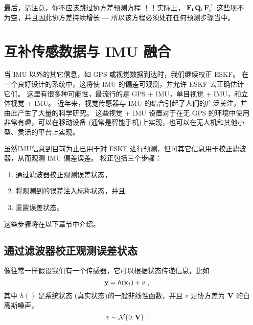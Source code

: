 最后，请注意，你不应该跳过协方差预测方程 ！！实际上， ${\bf F}_{\bf i}\,{\bf Q}_{\bf i}\,{\bf F}_{\bf i}^{\top}$ 这些项不为空，并且因此协方差持续增长 --- 所以该方程必须处在任何预测步骤当中。


\section{互补传感数据与 IMU 融合}
\label{sec:fusion}

当 IMU 以外的其它信息，如 GPS 或视觉数据到达时，我们继续校正 ESKF。
在一个良好设计的系统中，这将使 IMU 的偏差可观测，并允许 ESKF 去正确估计它们。 
这里有很多种可能性，最流行的是 GPS + IMU，单目视觉 + IMU，和立体视觉 + IMU。 
近年来，视觉传感器与 IMU 的结合引起了人们的广泛关注，并由此产生了大量的科学研究。 
这些视觉 + IMU 设置对于在无 GPS 的环境中使用非常有趣，可以在移动设备 (通常是智能手机)上实现，也可以在无人机和其他小型、灵活的平台上实现。

\bigskip

虽然IMU信息到目前为止已用于对 ESKF 进行预测，但可其它信息用于校正滤波器，从而观测 IMU 偏差误差。 
校正包括三个步骤：
\begin{enumerate}
\item
 通过滤波器校正观测误差状态， 
\item
 将观测到的误差注入标称状态，并且
\item	
 重置误差状态。 
\end{enumerate}%
%
这些步骤将在以下章节中介绍。

\subsection{通过滤波器校正观测误差状态}

像往常一样假设我们有一个传感器，它可以根据状态传递信息，比如
%
\begin{equation}
{\bf y} = h({\bf x}_t) + v~,
\end{equation}
%
其中 $h()$ 是系统状态 (真实状态)的一般非线性函数，并且 $v$ 是协方差为 ${\bf V}$ 的白高斯噪声，
%
\begin{equation}
v\sim\mathcal{N}\{0,{\bf V}\}~.
\end{equation}

